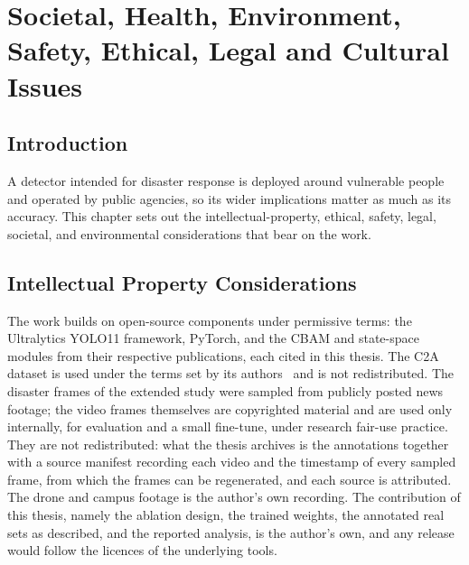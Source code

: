 \chapter{Societal, Health, Environment, Safety, Ethical, Legal and Cultural Issues}

\section{Introduction}
A detector intended for disaster response is deployed around vulnerable people and
operated by public agencies, so its wider implications matter as much as its
accuracy. This chapter sets out the intellectual-property, ethical, safety, legal,
societal, and environmental considerations that bear on the work.

\section{Intellectual Property Considerations}
The work builds on open-source components under permissive terms: the Ultralytics
YOLO11 framework, PyTorch, and the CBAM and state-space modules from their
respective publications, each cited in this thesis. The C2A dataset is used under
the terms set by its authors~\cite{nihal2024c2a} and is not redistributed. The
disaster frames of the extended study were sampled from publicly posted news
footage; the video frames themselves are copyrighted material and are used only
internally, for evaluation and a small fine-tune, under research fair-use
practice. They are not redistributed: what the thesis archives is the
annotations together with a source manifest recording each video and the
timestamp of every sampled frame, from which the frames can be regenerated, and
each source is attributed. The drone and campus footage is the author's own
recording. The contribution of this thesis, namely the ablation design, the
trained weights, the annotated real sets as described, and the reported
analysis, is the author's own, and any release would follow the licences of the
underlying tools.

